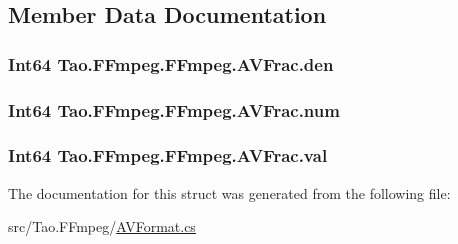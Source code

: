 \subsection{Member Data Documentation}
\hypertarget{struct_tao_1_1_f_fmpeg_1_1_f_fmpeg_1_1_a_v_frac_a663e72805fbb3ea5ba506535dcf5f497}{
\subsubsection[{den}]{\setlength{\rightskip}{0pt plus 5cm}Int64 {\bf Tao.FFmpeg.FFmpeg.AVFrac.den}}}
\label{struct_tao_1_1_f_fmpeg_1_1_f_fmpeg_1_1_a_v_frac_a663e72805fbb3ea5ba506535dcf5f497}
\hypertarget{struct_tao_1_1_f_fmpeg_1_1_f_fmpeg_1_1_a_v_frac_a6810cb3b736ccdc4fdcd2a04b5359253}{
\subsubsection[{num}]{\setlength{\rightskip}{0pt plus 5cm}Int64 {\bf Tao.FFmpeg.FFmpeg.AVFrac.num}}}
\label{struct_tao_1_1_f_fmpeg_1_1_f_fmpeg_1_1_a_v_frac_a6810cb3b736ccdc4fdcd2a04b5359253}
\hypertarget{struct_tao_1_1_f_fmpeg_1_1_f_fmpeg_1_1_a_v_frac_a87e1c14a7b7bab6702d8909ec6bb9850}{
\subsubsection[{val}]{\setlength{\rightskip}{0pt plus 5cm}Int64 {\bf Tao.FFmpeg.FFmpeg.AVFrac.val}}}
\label{struct_tao_1_1_f_fmpeg_1_1_f_fmpeg_1_1_a_v_frac_a87e1c14a7b7bab6702d8909ec6bb9850}


The documentation for this struct was generated from the following file:\begin{DoxyCompactItemize}
\item 
src/Tao.FFmpeg/\hyperlink{_a_v_format_8cs}{AVFormat.cs}\end{DoxyCompactItemize}
